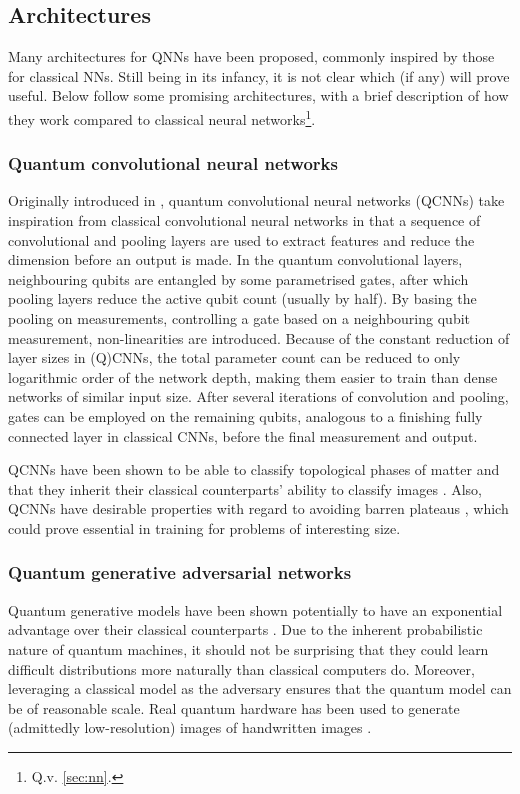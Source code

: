\subsection{Architectures}
\label{sec:qnn_arch}
Many architectures for QNNs have been proposed, commonly inspired by those for classical NNs.
Still being in its infancy, it is not clear which (if any) will prove useful.
Below follow some promising architectures, with a brief description of how they work compared to classical neural networks\footnote{Q.v. \cref{sec:nn}.}.

\subsubsection{Quantum convolutional neural networks}
\label{sec:qcnn}
Originally introduced in \cite{cong2019}, quantum convolutional neural networks (QCNNs) take inspiration from classical convolutional neural networks in that a sequence of convolutional and pooling layers are used to extract features and reduce the dimension before an output is made.
In the quantum convolutional layers, neighbouring qubits are entangled by some parametrised gates, after which pooling layers reduce the active qubit count (usually by half).
By basing the pooling on measurements, controlling a gate based on a neighbouring qubit measurement, non-linearities are introduced.
Because of the constant reduction of layer sizes in (Q)CNNs, the total parameter count can be reduced to only logarithmic order of the network depth, making them easier to train than dense networks of similar input size.
After several iterations of convolution and pooling, gates can be employed on the remaining qubits, analogous to a finishing fully connected layer in classical CNNs, before the final
measurement and output.

QCNNs have been shown to be able to classify topological phases of matter \cite{cong2019} and that they inherit their classical counterparts' ability to classify images \cite{oh2020}.
Also, QCNNs have desirable properties with regard to avoiding barren plateaus \cite{pesah2021}, which could prove essential in training for problems of interesting size.

\subsubsection{Quantum generative adversarial networks}
Quantum generative models have been shown potentially to have an exponential advantage over their classical counterparts \cite{gao2018}.
Due to the inherent probabilistic nature of quantum machines, it should not be surprising that they could learn difficult distributions more naturally than classical computers do.
Moreover, leveraging a classical model as the adversary ensures that the quantum model can be of reasonable scale.
Real quantum hardware has been used to generate (admittedly low-resolution) images of handwritten images \cite{huang2021}.

